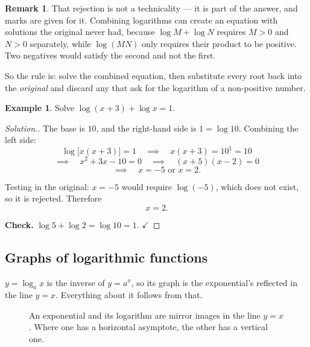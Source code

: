 \documentclass[11pt,a4paper]{article}
\theoremstyle{definition}
\newtheorem{example}[thm]{Example}
\newtheorem{remark}[thm]{Remark}
\newenvironment{solution}
  {\renewcommand{\qedsymbol}{}\begin{proof}[\textit{Solution}.]}
  {\end{proof}}
\let\amscheckmark\checkmark
\renewcommand{\checkmark}{\ensuremath{\amscheckmark}}
\begin{document}
\begin{remark}
That rejection is not a technicality --- it is part of the answer, and marks are given
for it. Combining logarithms can create an equation with solutions the original never
had, because $\log M+\log N$ requires $M>0$ and $N>0$ separately, while $\log(MN)$ only
requires their product to be positive. Two negatives would satisfy the second and not
the first.

So the rule is: solve the combined equation, then substitute every root back into the
\emph{original} and discard any that ask for the logarithm of a non-positive number.
\end{remark}

\begin{example}
Solve $\log(x+3)+\log x=1$.
\end{example}

\begin{solution}
The base is $10$, and the right-hand side is $1=\log 10$. Combining the left side:
$$\log\big[x(x+3)\big]=1\quad\implies\quad x(x+3)=10^1=10$$
$$\implies\quad x^2+3x-10=0\quad\implies\quad (x+5)(x-2)=0$$
$$\implies\quad x=-5 \text{ or } x=2.$$

Testing in the original: $x=-5$ would require $\log(-5)$, which does not exist, so it is
rejected. Therefore
$$x=2.$$

\textbf{Check.} $\log 5+\log 2=\log 10=1$. \checkmark
\end{solution}

\subsection{Graphs of logarithmic functions}

$y=\log_a x$ is the inverse of $y=a^x$, so its graph is the exponential's reflected in
the line $y=x$. Everything about it follows from that.

\begin{figure}[H]
\centering
{}
\caption{An exponential and its logarithm are mirror images in the line $y=x$. Where one has a horizontal asymptote, the other has a vertical one.}
\end{figure}
\end{document}
